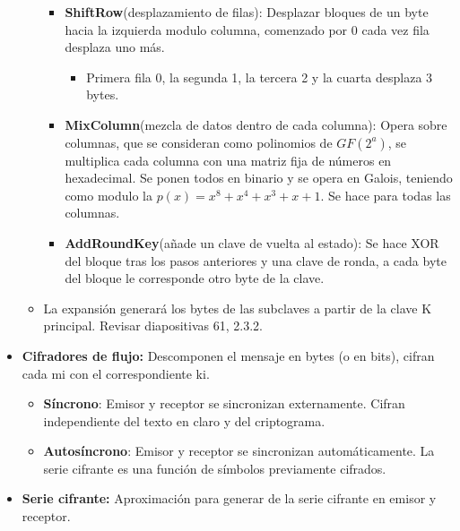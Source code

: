 \documentclass[12pt, twoside, openright]{report} %
\begin{document}
\begin{itemize}
\begin{itemize}
\begin{itemize}
\begin{itemize}
        \end{itemize}
      \item \textbf{ShiftRow}(desplazamiento de filas): Desplazar bloques de
        un byte hacia la izquierda modulo columna, comenzado por 0 cada
        vez fila desplaza uno más.
        

        \begin{itemize}
        \item Primera fila 0, la segunda 1, la tercera 2 y la cuarta
          desplaza 3 bytes.
          
        \end{itemize}
      \item \textbf{MixColumn}(mezcla de datos dentro de cada columna):
        Opera sobre columnas, que se consideran como polinomios de
        $GF(2^a)$, se multiplica cada columna con una matriz fija de
        números en hexadecimal. Se ponen todos en binario y se opera en
        Galois, teniendo como modulo la $p(x)=x^8+x^4+x^3+x+1$. Se hace para
        todas las columnas.
        
      \item \textbf{AddRoundKey}(añade un clave de vuelta al estado): Se
        hace XOR del bloque tras los pasos anteriores y una clave de
        ronda, a cada byte del bloque le corresponde otro byte de la
        clave.
        
      \end{itemize}
    \item La expansión generará los bytes de las subclaves a partir de la
      clave K principal. Revisar diapositivas 61, 2.3.2.
      
    \end{itemize}
  \item \textbf{Cifradores de flujo:} Descomponen el mensaje en bytes (o en
    bits), cifran cada mi con el correspondiente ki.
    

    \begin{itemize}
    \item \textbf{Síncrono}: Emisor y receptor se sincronizan externamente.
      Cifran independiente del texto en claro y del criptograma.
      
    \item \textbf{Autosíncrono}: Emisor y receptor se sincronizan
      automáticamente. La serie cifrante es una función de símbolos
      previamente cifrados.
      
    \end{itemize}
  \item \textbf{Serie cifrante:} Aproximación para generar de la serie
    cifrante en emisor y receptor.
    


\end{itemize}
\end{document}
